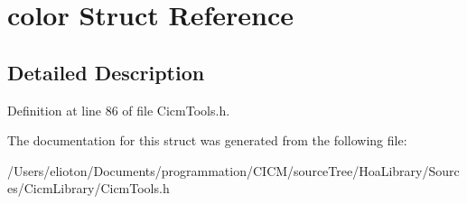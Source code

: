 \hypertarget{structcolor}{\section{color Struct Reference}
\label{structcolor}
}


\subsection{Detailed Description}


Definition at line 86 of file Cicm\-Tools.\-h.



The documentation for this struct was generated from the following file\-:\begin{DoxyCompactItemize}
\item 
/\-Users/elioton/\-Documents/programmation/\-C\-I\-C\-M/source\-Tree/\-Hoa\-Library/\-Sources/\-Cicm\-Library/Cicm\-Tools.\-h\end{DoxyCompactItemize}
